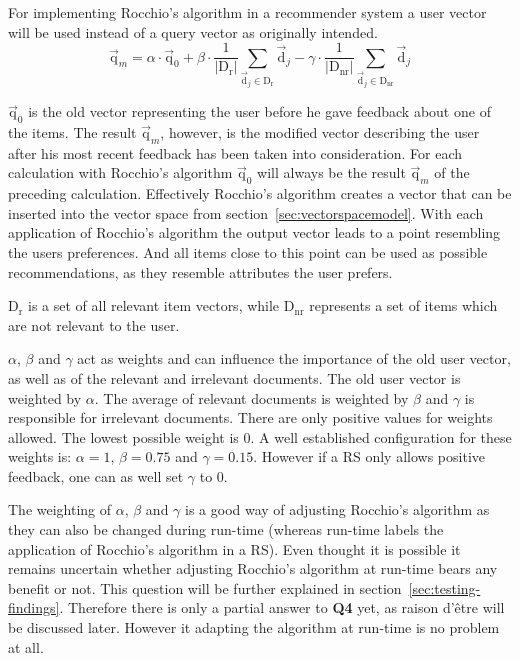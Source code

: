 For implementing Rocchio's algorithm in a recommender system a user vector will be used instead of a query vector as originally intended.
\begin{equation}
    \vec{\text{q}}_m =
        \alpha \cdot \vec{\text{q}}_0
        + \beta \cdot \frac{1}{|\text{D}_\text{r}|}\sum_{\vec{\text{d}}_j\in \text{D}_\text{r}} \vec{\text{d}}_j
        - \gamma \cdot \frac{1}{|\text{D}_\text{nr}|}\sum_{\vec{\text{d}}_j\in \text{D}_\text{nr}} \vec{\text{d}}_j
\end{equation}

$\vec{\text{q}}_0$ is the old vector representing the user before he gave feedback about one of the items.
The result $\vec{\text{q}}_m$, however, is the modified vector describing the user after his most recent feedback has been taken into consideration.
For each calculation with Rocchio's algorithm $\vec{\text{q}}_0$ will always be the result $\vec{\text{q}}_m$ of the preceding calculation.
Effectively Rocchio's algorithm creates a vector that can be inserted into the vector space from section~\ref{sec:vectorspacemodel}.
With each application of Rocchio's algorithm the output vector leads to a point resembling the users preferences.
And all items close to this point can be used as possible recommendations, as they resemble attributes the user prefers.

$\text{D}_\text{r}$ is a set of all relevant item vectors, while $\text{D}_\text{nr}$ represents a set of items which are not relevant to the user.

$\alpha$, $\beta$ and $\gamma$ act as weights and can influence the importance of the old user vector, as well as of  the relevant and irrelevant documents.
The old user vector is weighted by $\alpha$.
The average of relevant documents is weighted by $\beta$ and $\gamma$ is responsible for irrelevant documents.
There are only positive values for weights allowed.
The lowest possible weight is 0.
A well established configuration for these weights is: $\alpha = 1$, $\beta = 0.75$ and $\gamma = 0.15$.
However if a RS only allows positive feedback, one can as well set $\gamma$ to 0.
\citep[p.~178-183]{manning:2009}


The weighting of $\alpha$, $\beta$ and $\gamma$ is a good way of adjusting Rocchio's algorithm as they can also be changed during run-time (whereas run-time labels the application of Rocchio's algorithm in a RS).
Even thought it is possible it remains uncertain whether adjusting Rocchio's algorithm at run-time bears any benefit or not.
This question will be further explained in section~\ref{sec:testing-findings}.
Therefore there is only a partial answer to \textbf{Q4} yet, as raison d'\^{e}tre will be discussed later.
However it adapting the algorithm at run-time is no problem at all.

